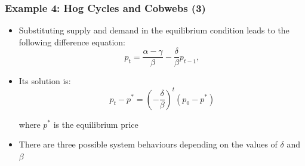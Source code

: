 \documentclass[10pt,usenames,dvipsnames]{beamer}
\theoremstyle{plain}
\theoremstyle{definition}
\begin{document}
\begin{frame}[fragile]
\frametitle{Example 4: Hog Cycles and Cobwebs (3)}
\begin{itemize}
	\item Substituting supply and demand in the equilibrium condition leads to the following difference equation:
	\[
		p_{t} = \frac{\alpha - \gamma}{\beta} - \frac{\delta}{\beta}p_{t-1},
	\]
	\item Its solution is:
	\[
		p_{t} - p^{*} = \left(-\frac{\delta}{\beta}\right)^{t}(p_{0} - p^{*})
	\]
	
	where $p^{*}$ is the equilibrium price
	\item There are three possible system behaviours depending on the values of $\delta$ and $\beta$
\end{itemize}
\end{frame}
\end{document}
